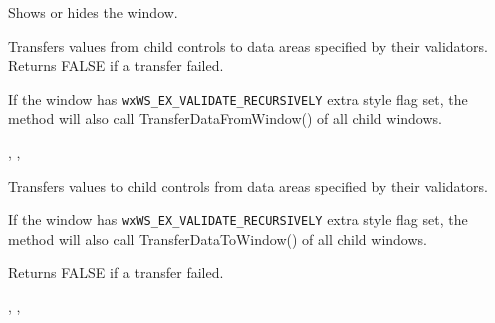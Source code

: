 
\label{wxwindowshow}


Shows or hides the window.





\label{wxwindowtransferdatafromwindow}


Transfers values from child controls to data areas specified by their validators. Returns
FALSE if a transfer failed.

If the window has {\tt wxWS\_EX\_VALIDATE\_RECURSIVELY} extra style flag set,
the method will also call TransferDataFromWindow() of all child windows.


,\rtfsp
{}, 

\label{wxwindowtransferdatatowindow}


Transfers values to child controls from data areas specified by their validators.

If the window has {\tt wxWS\_EX\_VALIDATE\_RECURSIVELY} extra style flag set,
the method will also call TransferDataToWindow() of all child windows.


Returns FALSE if a transfer failed.


,\rtfsp
{}, 

\label{wxwindowvalidate}


